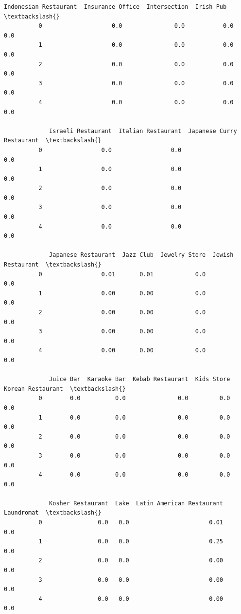 \documentclass[11pt]{article}
\begin{document}
\begin{Verbatim}[commandchars=\\\{\}]
             Indonesian Restaurant  Insurance Office  Intersection  Irish Pub  \textbackslash{}
          0                    0.0               0.0           0.0        0.0   
          1                    0.0               0.0           0.0        0.0   
          2                    0.0               0.0           0.0        0.0   
          3                    0.0               0.0           0.0        0.0   
          4                    0.0               0.0           0.0        0.0   
          
             Israeli Restaurant  Italian Restaurant  Japanese Curry Restaurant  \textbackslash{}
          0                 0.0                 0.0                        0.0   
          1                 0.0                 0.0                        0.0   
          2                 0.0                 0.0                        0.0   
          3                 0.0                 0.0                        0.0   
          4                 0.0                 0.0                        0.0   
          
             Japanese Restaurant  Jazz Club  Jewelry Store  Jewish Restaurant  \textbackslash{}
          0                 0.01       0.01            0.0                0.0   
          1                 0.00       0.00            0.0                0.0   
          2                 0.00       0.00            0.0                0.0   
          3                 0.00       0.00            0.0                0.0   
          4                 0.00       0.00            0.0                0.0   
          
             Juice Bar  Karaoke Bar  Kebab Restaurant  Kids Store  Korean Restaurant  \textbackslash{}
          0        0.0          0.0               0.0         0.0                0.0   
          1        0.0          0.0               0.0         0.0                0.0   
          2        0.0          0.0               0.0         0.0                0.0   
          3        0.0          0.0               0.0         0.0                0.0   
          4        0.0          0.0               0.0         0.0                0.0   
          
             Kosher Restaurant  Lake  Latin American Restaurant  Laundromat  \textbackslash{}
          0                0.0   0.0                       0.01         0.0   
          1                0.0   0.0                       0.25         0.0   
          2                0.0   0.0                       0.00         0.0   
          3                0.0   0.0                       0.00         0.0   
          4                0.0   0.0                       0.00         0.0   
          

\end{Verbatim}
\end{document}
